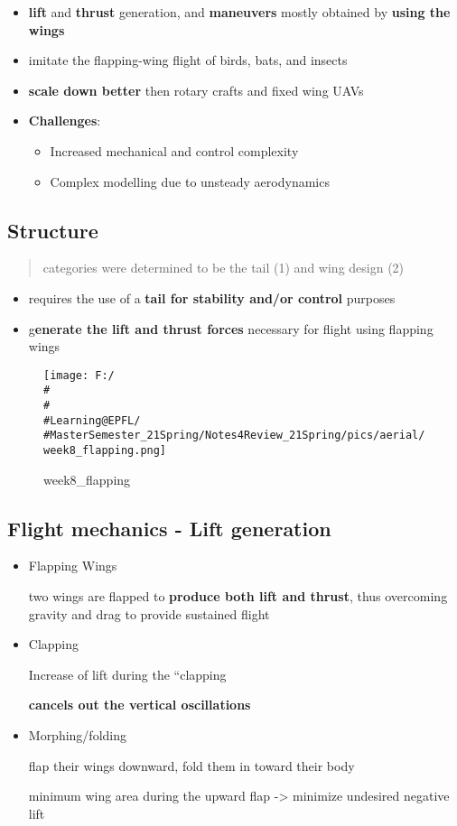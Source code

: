 \documentclass[]{article}
\begin{document}
\begin{itemize}
\item
  \textbf{lift} and \textbf{thrust} generation, and \textbf{maneuvers}
  mostly obtained by \textbf{using the wings}
\item
  imitate the flapping-wing flight of birds, bats, and insects
\item
  \textbf{scale down better} then rotary crafts and fixed wing UAVs
\item
  \textbf{Challenges}:

  \begin{itemize}
  \item
    Increased mechanical and control complexity
  \item
    Complex modelling due to unsteady aerodynamics
  \end{itemize}
\end{itemize}

\subsection{Structure}\label{header-n1607}

\begin{quote}
categories were determined to be the tail (1) and wing design (2)
\end{quote}

\begin{itemize}
\item
  requires the use of a \textbf{tail for stability and/or control}
  purposes
\item
  g\textbf{enerate the lift and thrust forces} necessary for flight
  using flapping wings
\end{itemize}

\begin{figure}
\centering
\texttt{[image: F:/\\\#\\\#\\\#Learning@EPFL/\\\#MasterSemester\_21Spring/Notes4Review\_21Spring/pics/aerial/week8\_flapping.png]}
\caption{week8\_flapping}
\end{figure}

\subsection{Flight mechanics - Lift generation}\label{header-n1616}

\begin{itemize}
\item
  Flapping Wings

  two wings are flapped to \textbf{produce both lift and thrust}, thus
  overcoming gravity and drag to provide sustained flight
\item
  Clapping

  Increase of lift during the ``clapping

  \textbf{cancels out the vertical oscillations}
\item
  Morphing/folding

  flap their wings downward, fold them in toward their body

  minimum wing area during the upward flap -\textgreater{} minimize
  undesired negative lift
\end{itemize}
\end{document}
